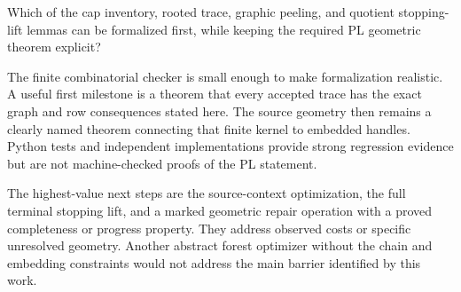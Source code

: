 \begin{question}
Which of the cap inventory, rooted trace, graphic peeling, and quotient
stopping-lift lemmas can be formalized first, while keeping the required
PL geometric theorem explicit?
\end{question}

The finite combinatorial checker is small enough to make formalization
realistic. A useful first milestone is a theorem that every accepted trace
has the exact graph and row consequences stated here. The source geometry
then remains a clearly named theorem connecting that finite kernel to
embedded handles. Python tests and independent implementations provide
strong regression evidence but are not machine-checked proofs of the PL
statement.

The highest-value next steps are the source-context optimization, the full
terminal stopping lift, and a marked geometric repair operation with a
proved completeness or progress property. They address observed costs or
specific unresolved geometry. Another abstract forest optimizer without
the chain and embedding constraints would not address the main barrier
identified by this work.
